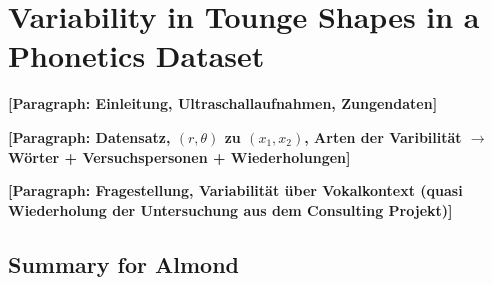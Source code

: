 \section{Variability in Tounge Shapes in a Phonetics Dataset}
\label{sec:4-tounges}
\textbf{[Paragraph: Einleitung, Ultraschallaufnahmen, Zungendaten]}

\textbf{[Paragraph: Datensatz, $(r,\theta)$ zu $(x_1, x_2)$, Arten der Varibilität $\rightarrow$ Wörter + Versuchspersonen + Wiederholungen]}

\textbf{[Paragraph: Fragestellung, Variabilität über Vokalkontext (quasi Wiederholung der Untersuchung aus dem Consulting Projekt)]}

\subsection*{Summary for Almond}
